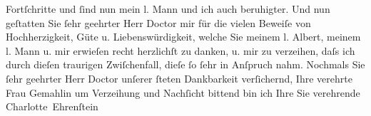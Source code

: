 \begin{ledgroupsized}[t]{13cm}
               Fortſchritte {\pb}und ſind nun mein l. Mann und ich auch beruhigter.\pend
           \pstart
           Und nun geſtatten Sie ſehr geehrter Herr Doctor mir für die vielen Beweiſe von
               Hochherzigkeit, Güte u. Liebenswürdigkeit, welche Sie meinem l. Albert, meinem l. Mann u. mir erwieſen recht herzlichſt zu danken, u. mir zu
               verzeihen, daſs ich durch dieſen traurigen Zwiſchenfall, dieſe ſo ſehr in Anſpruch
               nahm.\pend
           \pstart
           {\pb}Nochmals Sie ſehr geehrter Herr Doctor unſerer ſteten
               Dankbarkeit verſichernd, Ihre verehrte Frau Gemahlin um Verzeihung und Nachſicht bittend bin ich Ihre
               Sie verehrende\pend
           \pstart \spacefill\mbox{Charlotte Ehrenſtein}\pend{}
         
         \endnumbering{}\end{ledgroupsized}  \newcommand{\dateiname}{L01576}\newcommand{\titel}{Charlotte Ehrenstein an Arthur Schnitzler, [22. 1.? 1906]}\newcommand{\editorInnen}{Martin Anton Müller und Gerd-Hermann Susen}
      